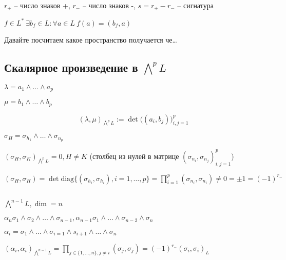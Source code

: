   $r_+$ -- число знаков +, $r_-$ -- число знаков -, $s = r_+ - r_-$ -- сигнатура

  $f \in L^* \ \exists b_f \in L : \forall a \in L \ f(a) = (b_f, a)$

  Давайте посчитаем какое пространство получается че\dots

  \subsection*{Скалярное произведение в $\bigwedge^p L$}

  $\lambda = a_1 \land \dotsc \land a_p$

  $\mu = b_1 \land \dotsc\land b_p$

  $$(\lambda, \mu)_{\bigwedge^pL} := \det\big( (a_i, b_j)  \big)^p_{i,j=1}$$

  $\sigma_H = \sigma_{h_1} \land \dotsc \land \sigma_{n_p}$

  $(\sigma_H, \sigma_K)_{\bigwedge^pL} = 0, H \neq K $ (столбец из нулей в матрице $(\sigma_{n_i}, \sigma_{n_j})^p_{i,j=1}$)

  $(\sigma_H, \sigma_H) = \det\text{diag}\{(\sigma_{h_i}, \sigma_{h_i}), i = 1, \dotsc, p \} = \prod^p_{i=1} (\sigma_{n_i}, \sigma_{n_i}) \neq 0 = \pm 1 = (-1)^{r_-}$

  \par $ $

  $\bigwedge^{n-1}L, \dim = n$

  $\alpha_n \sigma_1\land \sigma_2 \land \dotsc \land \sigma_{n-1}, \alpha_{n-1} \sigma_1 \land \dotsc \land \sigma_{n-2} \land \sigma_n $

  $\alpha_i = \sigma_1 \land \dotsc \land \sigma_{i=1} \land s_{i+1} \land \dotsc \land \sigma_n$

  $(\alpha_i, \alpha_i)_{\bigwedge^{n-1}L} = \prod_{j \in \{1, \dotsc, n\}, j \neq i} (\sigma_j, \sigma_j) = (-1)^{r_-} (\sigma_i, \sigma_i)_L$



